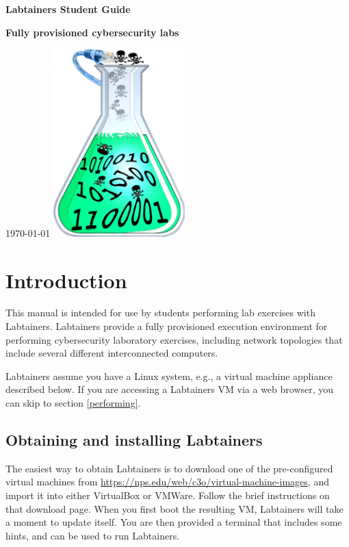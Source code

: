 \documentclass[12pt]{article}
\begin{document}
\begin{titlepage}
\centering
\vfill
\vspace*{4\baselineskip}
{\bfseries\Large
Labtainers Student Guide\par
}
\vspace*{4\baselineskip}
{\bfseries
Fully provisioned cybersecurity labs\par
}
\vspace*{2\baselineskip}
\today
\vfill
\includegraphics[width=2in]{labtainer5-sm.png}
\vfill
\end{titlepage}

\section {Introduction}
This manual is intended for use by students performing lab exercises with Labtainers.
Labtainers provide a fully provisioned execution environment for performing
cybersecurity laboratory exercises, including network topologies that include several different
interconnected computers.

Labtainers assume you have a Linux system, e.g., a virtual machine appliance described below.
If you are accessing a Labtainers VM via a web browser, you can skip to section \ref{performing}.

\subsection{Obtaining and installing Labtainers}
The easiest way to obtain Labtainers is to download one of the pre-configured virtual machines from
\url{https://nps.edu/web/c3o/virtual-machine-images}, and import it into either VirtualBox or VMWare.
Follow the brief instructions on that download page.  When you first boot the resulting VM,
Labtainers will take a moment to update itself.  You are then provided a terminal that includes
some hints, and can be used to run Labtainers.  
\end{document}
